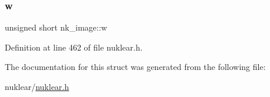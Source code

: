 \mbox{\label{structnk__image_aa860d11829d4baf42e0fb5d2f8e7b9af}} 
\subsubsection{\texorpdfstring{w}{w}}
{\footnotesize\ttfamily unsigned short nk\+\_\+image\+::w}



Definition at line 462 of file nuklear.\+h.



The documentation for this struct was generated from the following file\+:\begin{DoxyCompactItemize}
\item 
nuklear/\mbox{\hyperlink{nuklear_8h}{nuklear.\+h}}\end{DoxyCompactItemize}
